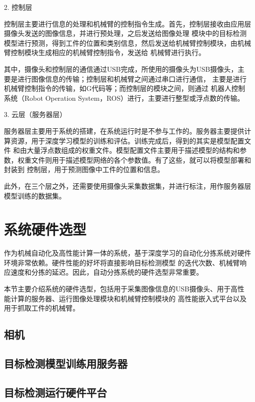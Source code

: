 2. 控制层

控制层主要进行信息的处理和机械臂的控制指令生成。首先，控制层接收由应用层摄像头发送的图像信息，并进行预处理，之后发送给图像处理
模块中的目标检测模型进行预测，得到工件的位置和类别信息，然后发送给机械臂控制模块，由机械臂控制模块生成相应的机械臂控制指令，发送给
机械臂进行执行。

其中，摄像头和控制层的通信通过USB完成，所使用的摄像头为USB摄像头，主要是进行图像信息的传输；控制层和机械臂之间通过串口进行通信，
主要是进行机械臂控制指令的传输，如G代码等；而控制层的模块之间，则通过
机器人控制系统（Robot Operation System，ROS）进行，主要进行整型或浮点数的传输。

3. 云层（服务器层）

服务器层主要用于系统的搭建，在系统运行时是不参与工作的。服务器主要提供计算资源，用于深度学习模型的训练和评估。训练完成后，得到的其实是模型配置文件
和由大量浮点数组成的权重文件。模型配置文件主要用于描述模型的结构和参数，权重文件则用于描述模型网络的各个参数值。有了这些，就可以将模型部署和封装到
控制层，用于预测图像中工件的位置和信息。

此外，在三个层之外，还需要使用摄像头采集数据集，并进行标注，用作服务器层模型训练的数据集。

\section{系统硬件选型}

作为机械自动化及高性能计算一体的系统，基于深度学习的自动化分拣系统对硬件环境非常依赖。硬件性能的好坏将直接影响目标检测模型
的迭代次数、机械臂响应速度和分拣的延迟。因此，自动分拣系统的硬件选型非常重要。

本节主要介绍系统的硬件选型，包括用于采集图像信息的USB摄像头、用于高性能计算的服务器、运行图像处理模块和机械臂控制模块的
高性能嵌入式平台以及用于抓取工件的机械臂。

\subsection{相机}

\subsection{目标检测模型训练用服务器}

\subsection{目标检测运行硬件平台}

